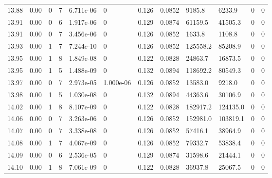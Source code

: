 \documentclass[preview]{standalone}
\begin{document}
{{{{{{{{{{{{{{{{{\begin{tabular}{L{1.2cm}C{1.2cm} C{0.3cm}C{0.5cm} C{1.4cm}C{1.4cm} C{1.4cm}C{1.4cm} C{1.6cm}C{1.6cm} C{1.6cm}C{1.6cm}}
  13.88  &  0.00  & 0     &  7 &  6.711e-06  & 0  &  0.126&   0.0852& 9185.8 & 6233.9   &  0 & 0  \\ 
  13.91  &  0.00  & 0     &  6 &  1.917e-06  & 0  &  0.129&   0.0874& 61159.5 & 41505.3   &  0 & 0  \\ 
  13.91  &  0.00  & 0     &  7 &  3.456e-06  & 0  &  0.126&   0.0852& 1633.8 & 1108.8   &  0 & 0  \\ 
  13.93  &  0.00  & 1     &  7 &  7.244e-10  & 0  &  0.126&   0.0852& 125558.2 & 85208.9   &  0 & 0  \\ 
  13.95  &  0.00  & 1     &  8 &  1.849e-08  & 0  &  0.122&   0.0828& 24863.7 & 16873.5   &  0 & 0  \\ 
  13.95  &  0.00  & 1     &  5 &  1.488e-09  & 0  &  0.132&   0.0894& 118692.2 & 80549.3   &  0 & 0  \\ 
  13.97  &  0.00  & 0     &  7 &  2.973e-05  & 1.000e-06  &  0.126&   0.0852& 13583.0 & 9218.0   &  0 & 0  \\ 
  13.98  &  0.00  & 1     &  5 &  1.030e-08  & 0  &  0.132&   0.0894& 44363.6 & 30106.9   &  0 & 0  \\ 
  14.02  &  0.00  & 1     &  8 &  8.107e-09  & 0  &  0.122&   0.0828& 182917.2 & 124135.0   &  0 & 0  \\ 
  14.06  &  0.00  & 0     &  7 &  3.263e-06  & 0  &  0.126&   0.0852& 152981.0 & 103819.1   &  0 & 0  \\ 
  14.07  &  0.00  & 0     &  7 &  3.338e-08  & 0  &  0.126&   0.0852& 57416.1 & 38964.9   &  0 & 0  \\ 
  14.08  &  0.00  & 1     &  7 &  4.067e-09  & 0  &  0.126&   0.0852& 79332.7 & 53838.4   &  0 & 0  \\ 
  14.09  &  0.00  & 0     &  6 &  2.536e-05  & 0  &  0.129&   0.0874& 31598.6 & 21444.1   &  0 & 0  \\ 
  14.10  &  0.00  & 1     &  8 &  7.061e-09  & 0  &  0.122&   0.0828& 36937.8 & 25067.5   &  0 & 0  \\ 
\hline 
\end{tabular} 

}}}}}}}}}}}}}}}}}
\end{document}
